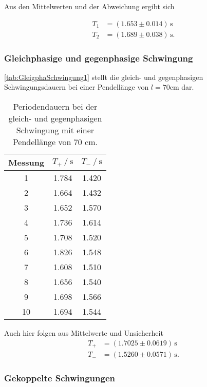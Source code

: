 Aus den Mittelwerten und der Abweichung ergibt sich 

\begin{align*}
  T_1 & = (1.653 \pm 0.014) \, \unit{\second} \\
  T_2 & = (1.689 \pm 0.038) \, \unit{\second}.
\end{align*}

\subsubsection{Gleichphasige und gegenphasige Schwingung}

\autoref{tab:GleigphaSchwingung1} stellt die gleich- und gegenphasigen Schwingungsdauern bei einer Pendellänge von $l=70 \unit{\centi\meter}$ dar.

\begin{table}[H]
  \centering
  \caption{Periodendauern bei der gleich- und gegenphasigen Schwingung mit einer Pendellänge von 70 cm.}
  \label{tab:GleigphaSchwingung1}
  \begin{tabular}{S[table-format=2.0] S S[table-format=1.3] }
    \toprule
    {Messung} & {$T_+ \mathbin{/} \unit{\second}$} & {$T_- \mathbin{/} \unit{\second}$} \\
     & 1.784 & 1.420 \\
    2 & 1.664 & 1.432 \\
    3 & 1.652 & 1.570 \\
    4 & 1.736 & 1.614 \\
    5 & 1.708 & 1.520 \\
    6 & 1.826 & 1.548 \\
    7 & 1.608 & 1.510 \\
    8 & 1.656 & 1.540 \\
    9 & 1.698 & 1.566 \\
   10 & 1.694 & 1.544 \\
    \bottomrule
  \end{tabular}
\end{table}

Auch hier folgen aus Mittelwerte und Unsicherheit
\begin{align*}
  T_+ & = (1.7025 \pm 0.0619) \, \unit{\second} \\
  T_- & = (1.5260 \pm 0.0571) \, \unit{\second}.
\end{align*}


\subsubsection{Gekoppelte Schwingungen}

